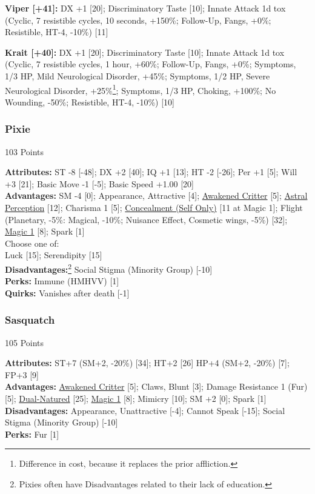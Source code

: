 \begin{multicols*}{3}
	\textbf{Viper [+41]:} DX +1 [20]; Discriminatory Taste [10]; Innate Attack 1d tox (Cyclic, 7 resistible cycles, 10 seconds, +150\%; Follow-Up, Fangs, +0\%; Resistible, HT-4, -10\%) [11]
	
	\textbf{Krait [+40]:} DX +1 [20]; Discriminatory Taste [10]; Innate Attack 1d tox (Cyclic, 7 resistible cycles, 1 hour, +60\%; Follow-Up, Fangs, +0\%; Symptoms, 1/3 HP, Mild Neurological Disorder, +45\%; Symptoms, 1/2 HP, Severe Neurological Disorder, +25\%\footnote{Difference in cost, because it replaces the prior affliction.}; Symptoms, 1/3 HP, Choking, +100\%; No Wounding, -50\%; Resistible, HT-4, -10\%) [10]
	
	\subsubsection*{Pixie}
	\begin{flushright}
		103 Points
	\end{flushright}
	\textbf{Attributes:} 
	ST -8 [-48]; DX +2 [40]; IQ +1 [13]; HT -2 [-26]; Per +1 [5]; Will +3 [21]; Basic Move -1 [-5]; Basic Speed +1.00 [20]
	\\\textbf{Advantages:} 
	SM -4 [0]; Appearance, Attractive [4]; \hyperref[awakened_critter]{Awakened Critter} [5]; \hyperref[astral_perception]{Astral Perception} [12]; Charisma 1 [5]; \hyperref[concealment_self_only]{Concealment (Self Only)} [11 at Magic 1]; Flight (Planetary, -5\%: Magical, -10\%; Nuisance Effect,  Cosmetic wings, -5\%) [32]; \hyperref[magic]{Magic 1} [8]; Spark [1]
	\\ Choose one of: \\
	Luck [15]; Serendipity [15]
	\\\textbf{Disadvantages:}\footnote{Pixies often have Disadvantages related to their lack of education.}
	Social Stigma (Minority Group) [-10]
	\\\textbf{Perks:}
	Immune (HMHVV) [1]
	\\\textbf{Quirks:}
	Vanishes after death [-1]
	
	\subsubsection*{Sasquatch}
	\begin{flushright}
		105 Points
	\end{flushright}
	\textbf{Attributes:} 
	ST+7 (SM+2, -20\%) [34]; HT+2 [26] HP+4 (SM+2, -20\%) [7]; FP+3 [9]
	\\\textbf{Advantages:} 
	\hyperref[awakened_critter]{Awakened Critter} [5]; Claws, Blunt [3]; Damage Resistance 1 (Fur) [5];  \hyperref[dual_natured]{Dual-Natured} [25]; \hyperref[magic]{Magic 1} [8]; Mimicry [10]; SM +2 [0]; Spark [1]
	\\\textbf{Disadvantages:} 
	Appearance, Unattractive [-4]; Cannot Speak [-15]; Social Stigma (Minority Group) [-10]
	\\\textbf{Perks:}
	Fur [1]
	

\end{multicols*}
